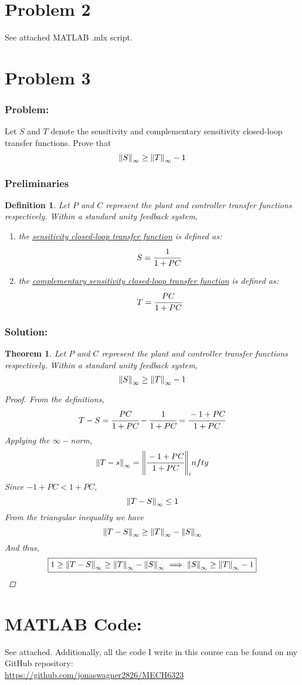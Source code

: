 \documentclass[letter]{article}
\numberwithin{equation}{section}
\newtheorem{definition}{Definition}
\newtheorem{theorem}{Theorem}
\begin{document}
\section{Problem 2}
See attached MATLAB .mlx script.


\newpage
\section{Problem 3}
\subsubsection*{Problem:}
Let $S$ and $T$ denote the sensitivity and complementary sensitivity closed-loop transfer functions.
Prove that\[
    \norm{S}_\infty \geq \norm{T}_\infty - 1
\]
\subsubsection*{Preliminaries}
\begin{definition}
    Let $P$ and $C$ represent the plant and controller transfer functions respectively. 
    Within a standard unity feedback system, \begin{enumerate}
        \item the \underline{\emph{sensitivity closed-loop transfer function}} is defined as:\[
            S = \cfrac{1}{1+PC}
        \] \item the \underline{\emph{complementary sensitivity closed-loop transfer function}} is defined as:\[
            T = \cfrac{PC}{1+PC}
        \]
    \end{enumerate}
\end{definition}
\subsubsection*{Solution:}
\begin{theorem}
    Let $P$ and $C$ represent the plant and controller transfer functions respectively. 
    Within a standard unity feedback system, \[
        \norm{S}_\infty \geq \norm{T}_\infty - 1
    \]
    \begin{proof}
        From the definitions, \[
            T - S = \cfrac{PC}{1+PC} - \cfrac{1}{1+PC} = \cfrac{-1 + PC}{1 + PC}
        \] Applying the $\infty-$norm,\[
            \norm{T - s}_\infty = \norm{\cfrac{-1 + PC}{1 + PC}}_infty
        \] Since ${-1 + PC} < {1 + PC}$, \[
            \norm{T - S}_\infty \leq 1
        \] From the triangular inequality we have\[
            \norm{T - S}_\infty \geq \norm{T}_\infty - \norm{S}_\infty
        \] And thus,\[\boxed{
            1 \geq \norm{T - S}_\infty \geq \norm{T}_\infty - \norm{S}_\infty
            \implies \norm{S}_\infty \geq \norm{T}_\infty - 1
        }\]
    \end{proof}
\end{theorem}

\newpage
\appendix
\section{MATLAB Code:}\label{apx:matlab}
See attached.
Additionally, all the code I write in this course can be found on my GitHub repository:\\
\href{https://github.com/jonaswagner2826/MECH6323}{https://github.com/jonaswagner2826/MECH6323}
\end{document}
